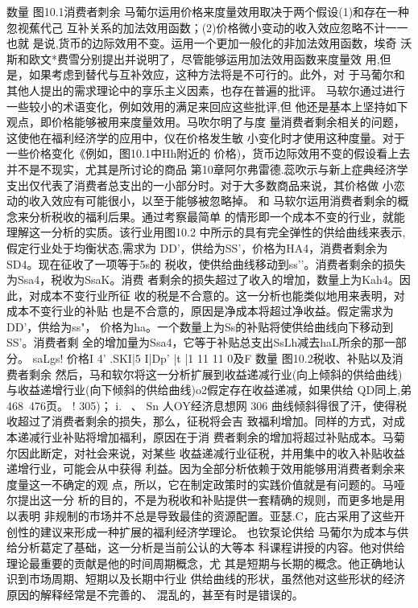 数量
图10.1消费者刺余
马葡尔运用价格来度量效用取决于两个假设(1)和存在一种忽视蕉代己
互补关系的加法效用函数；(2)价格微小变动的收入效应忽略不计一一也就
是说,货币的边际效用不变。运用一个更加一般化的非加法效用函数，埃奇
沃斯和欧文*费雪分别提出并说明了，尽管能够运用加法效用函数来度量效
用,但是，如果考虑到替代与互补效应，这种方法将是不可行的。此外，对
于马葡尔和其他人提出的需求理论中的享乐主义因素，也存在普遍的批评。
马软尔通过进行一些较小的术语变化，例如效用的满足来回应这些批评,但
他还是基本上坚持如下观点，即价格能够被用来度量效用。马吹尔明了与度
量消费者剩余相关的问题，这使他在福利经济学的应用中，仪在价格发生敏
小变化时才使用这种度量。对于一些价格变化《例如，图10.1中Hh附近的
价格)，货币边际效用不变的假设看上去并不是不现实，尤其是所讨论的商品
第10章阿尔弗雷德.蕊吹示与新上症典经济学
支出仅代表了消费者总支出的一小部分时。对于大多数商品来说，其价格做
小恋动的收入效应有可能很小，以至于能够被忽略掉。
和%
马软尔运用消费者剩余的概念来分析税收的福利后果。通过考察最简单
的情形即一个成本不变的行业，就能理解这一分析的实质。该行业用图10.2
中所示的具有完全弹性的供给曲线来表示,假定行业处于均衡状态,需求为
DD'，供给为SS'，价格为HA4，消费者剩余为SD4。现在征收了一项等于5s的
税收，使供给曲线移动到ss’'。消费者剩余的损失为Ssa4，税收为SsaK。消费
者剩余的损失超过了收入的增加，数量上为Kah4。因此，对成本不变行业所征
收的税是不合意的。这一分析也能类似地用来表明，对成本不变行业的补贴
也是不合意的，原因是净成本将超过净收益。假定需求为DD'，供给为ss"，
价格为ha。一个数量上为Ss的补贴将使供给曲线向下移动到SS'。消费者剩
全的增加量为Ssa4，它等于补贴总支出SsLh减去haL所余的那一部分。
saLgs!
价格I
4'
.SKI|5
I|Dp'
|t
|1
11
11
0及F
数量
图10.2税收、补贴以及消费者剩余
然后，马和软尔将这一分析扩展到收益递减行业(向上倾斜的供给曲线)
与收益递增行业(向下倾斜的供给曲线)o2假定存在收益递减，如果供给
QD同上,弟468~476页。
!
305)；
i.
~、
Sn
人OY经济息想网
306
曲线倾斜得很了汗，使得税收超过了消费者剩余的损失，那么，征税将会吉
致福利增加。同样的方式，对成本递减行业补贴将增加福利，原因在于消
费者剩余的增加将超过补贴成本。马菊尔因此断定，对社会来说，对某些
收益递减行业征税，并用集中的收入补贴收益递增行业，可能会从中获得
利益。因为全部分析依赖于效用能够用消费者剩余来度量这一不确定的观
点，所以，它在制定政策时的实践价值就是有问题的。马哑尔提出这一分
析的目的，不是为税收和补贴提供一套精确的规则，而更多地是用以表明
非规制的市场并不总是导致最佳的资源配置。亚瑟.C，庇古采用了这些开
创性的建议来形成一种扩展的福利经济学理论。
也钦泵论供给
马葡尔为成本与供给分析葛定了基础，这一分析是当前公认的大等本
科课程讲授的内容。他对供给理论最重要的贡献是他的时间周期概念，尤
其是短期与长期的概念。他正确地认识到市场周期、短期以及长期中行业
供给曲线的形状，虽然他对这些形状的经济原因的解释经常是不完善的、
混乱的，甚至有时是错误的。

